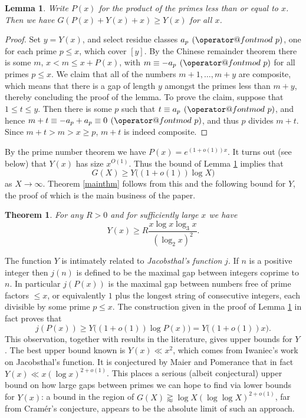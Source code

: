 \documentclass[11pt]{amsart}
\makeatletter
\numberwithin{equation}{section}  %
\theoremstyle{remark}
\theoremstyle{plain}
\newtheorem{lem}{Lemma}[section]
\newtheorem{thm}{Theorem}
\numberwithin{equation}{section}
\renewcommand{\pmod}[1]{\allowbreak\mkern7mu({\operator@font mod}\,\,#1)}
\renewcommand{\leq}{\leqslant}
\renewcommand{\geq}{\geqslant}
\renewcommand{\(}{\left(}
\renewcommand{\)}{\right)}
\makeatother
\begin{document}
\begin{lem}\label{lem11}
Write $P(x)$ for the product of the primes less than or equal to $x$. Then we have $G(P(x)+ Y(x) + x) \geq Y(x)$ for all $x$.
\end{lem}
\begin{proof}
Set $y = Y(x)$, and select residue classes $a_p \pmod{p}$, one for each prime $p \leq x$, which cover $[y]$. By the Chinese remainder theorem there is some $m$, $x <  m \leq x +P(x)$, with $m \equiv -a_p \pmod{p}$ for all primes $p \leq x$. We claim that all of the numbers $m+1,\dots, m+y$ are composite, which means that there is a gap of length $y$ amongst the primes less than $m+y$, thereby concluding the proof of the lemma. To prove the claim, suppose that $1 \leq t \leq y$. Then there is some $p$ such that $t \equiv a_p \pmod{p}$, and hence $m + t \equiv -a_p + a_p \equiv 0 \pmod{p}$, and thus $p$ divides $m + t$. Since $m+t > m > x \geq p$, $m + t$ is indeed composite.
\end{proof}

By the prime number theorem we have $P(x) = e^{(1 + o(1))x}$. It turns out (see below) that $Y(x)$ has size $x^{O(1)}$. Thus the bound of Lemma \ref{lem11} implies that
\[ G(X) \geq Y\big((1 + o(1)) \log X\big)\]
as $X \to \infty$.  Theorem \ref{mainthm} follows from this and the following bound for $Y$, the proof of which is the main business of the paper.
\begin{thm}\label{mainthm-y}
For any $R > 0$ and for sufficiently large $x$ we have
\begin{equation}\label{yxdef}
 Y(x) \geq R \frac{x \log x \log_3 x}{(\log_2 x)^2}.
\end{equation}
\end{thm}


The function $Y$ is intimately related to \emph{Jacobsthal's function} $j$. If $n$ is a positive integer then $j(n)$ is defined to be the maximal gap between integers coprime to $n$. In particular $j(P(x))$ is the maximal gap between numbers free of prime factors $\leq x$, or equivalently $1$ plus the longest string of consecutive integers, each divisible by some prime $p \leq x$.  The construction given in the proof of Lemma \ref{lem11} in fact proves that 
\[ j(P(x)) \geq Y\big((1 + o(1)) \log P(x)\big) = Y\big((1 + o(1)) x\big).\]
This observation, together with results in the literature, gives upper bounds for $Y$. The best upper bound known is $Y(x) \ll x^2$, which comes from Iwaniec's work \cite{Iw} on Jacobsthal's function. It is conjectured by Maier and Pomerance that in fact $Y(x) \ll x (\log x)^{2 + o(1)}$. This places a serious (albeit conjectural) upper bound on how large gaps between primes we can hope to find via lower bounds for $Y(x)$: a bound in the region of $G(X) \gtrapprox \log X (\log \log X)^{2 + o(1)}$, far from Cram\'er's conjecture, appears to be the absolute limit of such an approach.
\end{document}
